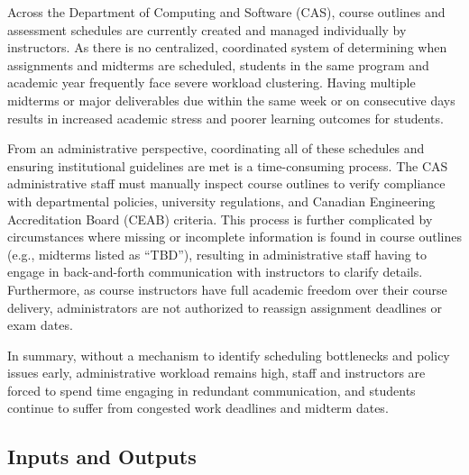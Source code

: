 \documentclass{article}
\begin{document}

Across the Department of Computing and Software (CAS), course outlines and assessment
schedules are currently created and managed individually by instructors.
As there is no centralized, coordinated system of determining when assignments and midterms
are scheduled, students in the same program and academic year frequently face severe workload
clustering. Having multiple midterms or major deliverables due within the same week or
on consecutive days results in increased academic stress and poorer learning outcomes for students.

\bigskip
From an administrative perspective, coordinating all of these schedules and ensuring institutional
guidelines are met is a time-consuming process. The CAS administrative
staff must manually inspect course outlines to verify compliance with departmental policies, university
regulations, and Canadian Engineering Accreditation Board (CEAB) criteria. This process is further
complicated by circumstances where missing or incomplete information is found in course outlines
(e.g., midterms listed as ``TBD''), resulting in administrative staff having to engage in back-and-forth
communication with instructors to clarify details. Furthermore, as course instructors have full academic
freedom over their course delivery, administrators are not authorized to reassign assignment deadlines or exam dates.

\bigskip
In summary, without a mechanism to identify scheduling bottlenecks and policy issues early, 
administrative workload remains high, staff and instructors are forced to spend time engaging in redundant communication,
and students continue to suffer from congested work deadlines and midterm dates.



\subsection{Inputs and Outputs}
\end{document}
